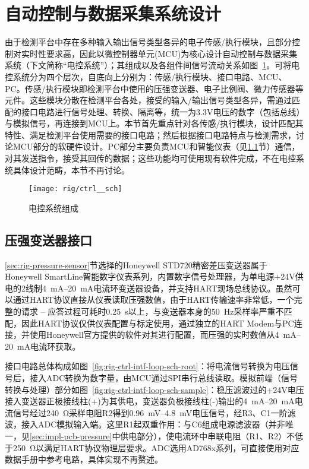 \clearpage



\section{自动控制与数据采集系统设计}\label{sec:rig-ctrl}

由于检测平台中存在多种输入输出信号类型各异的电子传感/执行模块，且部分控制对实时性要求高，因此以微控制器单元(MCU)为核心设计自动控制与数据采集系统（下文简称“电控系统”）；其组成以及各组件间信号流动关系如图~\ref{fig:rig-ctrl-sch}。可将电控系统分为四个层次，自底向上分别为：传感/执行模块、接口电路、MCU、PC。传感/执行模块即检测平台中使用的压强变送器、电子比例阀、微力传感器等元件。这些模块分散在检测平台各处，接受的输入/输出信号类型各异，需通过匹配的接口电路进行信号处理、转换、隔离等，统一为3.3V电压的数字（包括总线）与模拟信号，再连接到MCU上。本节首先重点针对各传感/执行模块，设计匹配其特性、满足检测平台使用需要的接口电路；然后根据接口电路特点与检测需求，讨论MCU部分的软硬件设计。PC部分主要负责MCU和智能仪表（见\ref{sec:rig-ctrl-intf-loop}节）通信，对其发送指令，接受其回传的数据；这些功能均可使用现有软件完成，不在电控系统具体设计范畴，本节不再讨论。

\begin{figure}[h]
\centering
\texttt{[image: rig/ctrl\_\_sch]}
\caption{电控系统组成}
\label{fig:rig-ctrl-sch}
\end{figure}



\subsection{压强变送器接口}\label{sec:rig-ctrl-intf-loop}

\ref{sec:rig-pressure-sensor}节选择的Honeywell STD720精密差压变送器属于Honeywell SmartLine智能数字仪表系列，内置数字信号处理器，为单电源+24V供电的2线制\SIrange{4}{20}{\milli\ampere}电流环变送器设备，并支持HART现场总线协议。虽然可以通过HART协议直接从仪表读取压强数值，由于HART传输速率非常低，一个完整的请求 -- 应答过程可耗时\SI{0.25}{\second}以上，与变送器本身的\SI{50}{\hertz}采样率严重不匹配，因此HART协议仅供仪表配置与标定使用，通过独立的HART Modem与PC连接，并使用Honeywell官方提供的软件对其进行配置，而压强的实时数值从\SIrange{4}{20}{\milli\ampere}电流环获取。

接口电路总体构成如图~\ref{fig:rig-ctrl-intf-loop-sch-root}：将电流信号转换为电压信号后，接入ADC转换为数字量，由MCU通过SPI串行总线读取。模拟前端（信号转换与处理）部分如图~\ref{fig:rig-ctrl-intf-loop-sch-sample}：稳压滤波过的+24V电压接入变送器正极接线柱(+)为其供电，变送器负极接线柱(-)输出的\SIrange{4}{20}{\milli\ampere}电流信号经过\SI{240}{\ohm}采样电阻R2得到\SIrange{0.96}{4.8}{\milli\volt}电压信号，经R3、C1一阶滤波，接入ADC模拟输入端。这里R1起双重作用：与C6组成电源滤波器（并非唯一，见\ref{sec:impl-pcb-pressure}中供电部分），使电流环中串联电阻（R1、R2）不低于\SI{250}{\ohm}以满足HART协议物理层要求。ADC选用AD768x系列\footnotemark{}，可直接使用对应数据手册中参考电路，具体实现不再赘述。

